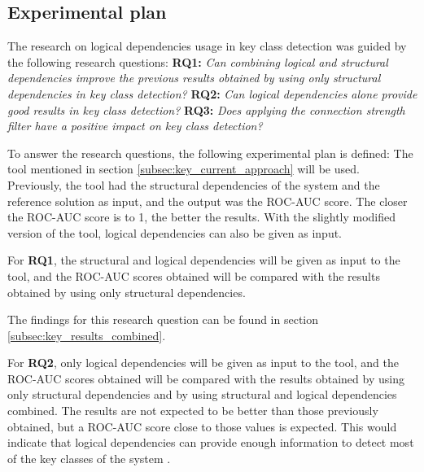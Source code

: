 \subsection{Experimental plan}
\label{subsec:key_plan}

\hspace{4em}The research on logical dependencies usage in key class detection was guided by the following research questions: \textbf{RQ1:} \textit{Can combining logical and structural dependencies improve the previous results obtained by using only structural dependencies in key class detection?} \textbf{RQ2:} \textit{Can logical dependencies alone provide good results in key class detection?} \textbf{RQ3:} \textit{Does applying the connection strength filter have a positive impact on key class detection?}

To answer the research questions, the following experimental plan is defined: The tool mentioned in section \ref{subsec:key_current_approach} will be used. Previously, the tool had the structural dependencies of the system and the reference solution as input, and the output was the ROC-AUC score. The closer the ROC-AUC score is to 1, the better the results. With the slightly modified version of the tool, logical dependencies can also be given as input.


For \textbf{RQ1}, the structural and logical dependencies will be given as input to the tool, and the ROC-AUC scores obtained will be compared with the results obtained by using only structural dependencies.

\noindent{}
\medskip

The findings for this research question can be found in section \ref{subsec:key_results_combined}.


For \textbf{RQ2}, only logical dependencies will be given as input to the tool, and the ROC-AUC scores obtained will be compared with the results obtained by using only structural dependencies and by using structural and logical dependencies combined. The results are not expected to be better than those previously obtained, but a ROC-AUC score close to those values is expected. This would indicate that logical dependencies can provide enough information to detect most of the key classes of the system \cite{b4}.

\medskip

